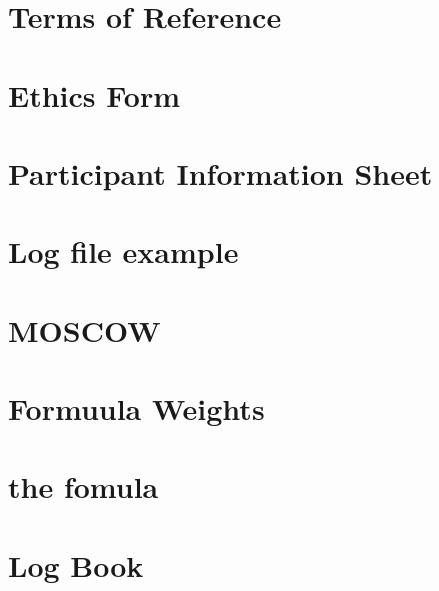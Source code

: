\chapter{Terms of Reference}
\chapter{Ethics Form}

\chapter{Participant Information Sheet}

\chapter{Log file example}

\chapter{MOSCOW} \label{Moscow}

\chapter{Formuula Weights}

\chapter{the fomula} \label{code}

\chapter{Log Book}
